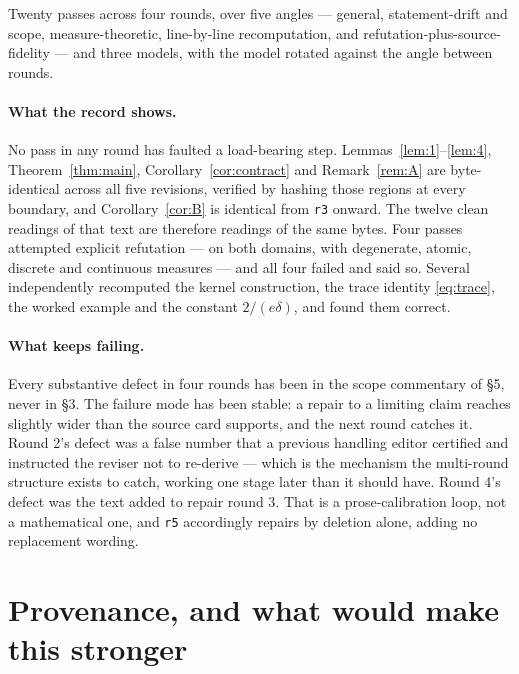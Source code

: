 \documentclass[11pt]{article}
\theoremstyle{remark}
\begin{document}
\noindent Twenty passes across four rounds, over five angles --- general, statement-drift and
scope, measure-theoretic, line-by-line recomputation, and refutation-plus-source-fidelity ---
and three models, with the model rotated against the angle between rounds.

\paragraph{What the record shows.} No pass in any round has faulted a load-bearing step.
Lemmas~\ref{lem:1}--\ref{lem:4}, Theorem~\ref{thm:main}, Corollary~\ref{cor:contract} and
Remark~\ref{rem:A} are byte-identical across all five revisions, verified by hashing those
regions at every boundary, and Corollary~\ref{cor:B} is identical from \texttt{r3} onward. The
twelve clean readings of that text are therefore readings of the same bytes. Four passes
attempted explicit refutation --- on both domains, with degenerate, atomic, discrete and
continuous measures --- and all four failed and said so. Several independently recomputed the
kernel construction, the trace identity \eqref{eq:trace}, the worked example and the constant
$2/(e\delta)$, and found them correct.

\paragraph{What keeps failing.} Every substantive defect in four rounds has been in the scope
commentary of \S5, never in \S3. The failure mode has been stable: a repair to a limiting claim
reaches slightly wider than the source card supports, and the next round catches it. Round 2's
defect was a false number that a previous handling editor certified and instructed the reviser
not to re-derive --- which is the mechanism the multi-round structure exists to catch, working
one stage later than it should have. Round 4's defect was the text added to repair round 3.
That is a prose-calibration loop, not a mathematical one, and \texttt{r5} accordingly repairs
by deletion alone, adding no replacement wording.

\section{Provenance, and what would make this stronger}
\end{document}
